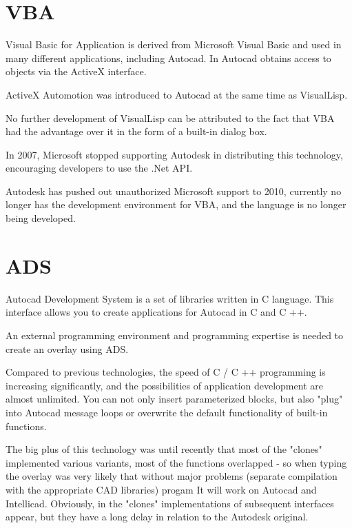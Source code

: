 \documentclass[a4paper, 11pt, article]{report}
\begin{document}
\section{VBA}

Visual Basic for Application is derived from Microsoft Visual Basic and used in many different applications, including Autocad. In Autocad obtains access to objects via the ActiveX interface.

ActiveX Automotion was introduced to Autocad at the same time as VisualLisp.

No further development of VisualLisp can be attributed to the fact that VBA had the advantage over it in the form of a built-in dialog box.

In 2007, Microsoft stopped supporting Autodesk in distributing this technology, encouraging developers to use the .Net API.

Autodesk has pushed out unauthorized Microsoft support to 2010, currently no longer has the development environment for VBA, and the language is no longer being developed.

\section{ADS}

Autocad Development System is a set of libraries written in C language. This interface allows you to create applications for Autocad in C and C ++.

An external programming environment and programming expertise is needed to create an overlay using ADS.

Compared to previous technologies, the speed of C / C ++ programming is increasing significantly, and the possibilities of application development are almost unlimited. You can not only insert parameterized blocks, but also "plug" into Autocad message loops or overwrite the default functionality of built-in functions.

The big plus of this technology was until recently that most of the "clones" implemented various variants, most of the functions overlapped - so when typing the overlay was very likely that without major problems (separate compilation with the appropriate CAD libraries) progam It will work on Autocad and Intellicad. Obviously, in the "clones" implementations of subsequent interfaces appear, but they have a long delay in relation to the Autodesk original.
\end{document}
